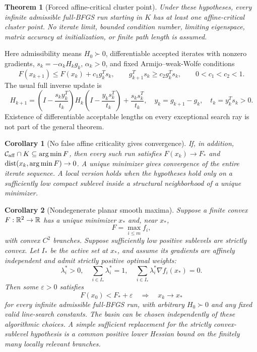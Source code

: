 \documentclass[10pt,oneside,openany]{book}
\newtheorem{theorem}{Theorem}[chapter]
\newtheorem{corollary}{Corollary}[chapter]
\theoremstyle{remark}\newtheorem{remark}{Remark}[chapter]
\begin{document}
\begin{theorem}[Forced affine-critical cluster point]\label{C:thm:cluster}
Under these hypotheses, every infinite admissible full-BFGS run starting in $K$ has at least one affine-critical cluster point. No iterate limit, bounded condition number, limiting eigenspace, matrix accuracy at initialization, or finite path length is assumed.
\end{theorem}

Here admissibility means $H_0\succ0$, differentiable accepted iterates with nonzero gradients, $s_k=-\alpha_kH_kg_k$, $\alpha_k>0$, and fixed Armijo--weak-Wolfe conditions
\begin{equation}\label{C:eq:AW}
 F(x_{k+1})\le F(x_k)+c_1g_k^Ts_k,\qquad
 g_{k+1}^Ts_k\ge c_2g_k^Ts_k,\qquad 0<c_1<c_2<1.
\end{equation}
The usual full inverse update is
\begin{equation}\label{C:eq:bfgs}
 H_{k+1}=\left(I-\frac{s_ky_k^T}{t_k}\right)H_k
 \left(I-\frac{y_ks_k^T}{t_k}\right)+\frac{s_ks_k^T}{t_k},\quad
 y_k=g_{k+1}-g_k,\quad t_k=y_k^Ts_k>0.
\end{equation}
Existence of differentiable acceptable lengths on every exceptional search ray is not part of the general theorem.

\begin{corollary}[No false affine criticality gives convergence]\label{C:cor:AC}
If, in addition, $\mathcal C_{\rm aff}\cap K\subseteq\arg\min F$, then every such run satisfies $F(x_k)\to F_*$ and $\operatorname{dist}(x_k,\arg\min F)\to0$. A unique minimizer gives convergence of the entire iterate sequence. A local version holds when the hypotheses hold only on a sufficiently low compact sublevel inside a structural neighborhood of a unique minimizer.
\end{corollary}

\begin{corollary}[Nondegenerate planar smooth maxima]\label{C:cor:max}
Suppose a finite convex $F:\mathbb R^2\to\mathbb R$ has a unique minimizer $x_*$ and, near $x_*$,
\[
 F=\max_{i\le m}f_i,
\]
with convex $C^2$ branches. Suppose sufficiently low positive sublevels are strictly convex. Let $I_*$ be the active set at $x_*$, and assume its gradients are affinely independent and admit strictly positive optimal weights:
\begin{equation}\label{C:eq:nondeg}
 \lambda_i^*>0,\quad \sum_{i\in I_*}\lambda_i^*=1,\quad
 \sum_{i\in I_*}\lambda_i^*\nabla f_i(x_*)=0.
\end{equation}
Then some $\varepsilon>0$ satisfies
\[
 F(x_0)<F_*+\varepsilon\quad\Longrightarrow\quad x_k\to x_*
\]
for every infinite admissible full-BFGS run, with arbitrary $H_0\succ0$ and any fixed valid line-search constants. The basin can be chosen independently of these algorithmic choices. A simple sufficient replacement for the strictly convex-sublevel hypothesis is a common positive lower Hessian bound on the finitely many locally relevant branches.
\end{corollary}
\end{document}
